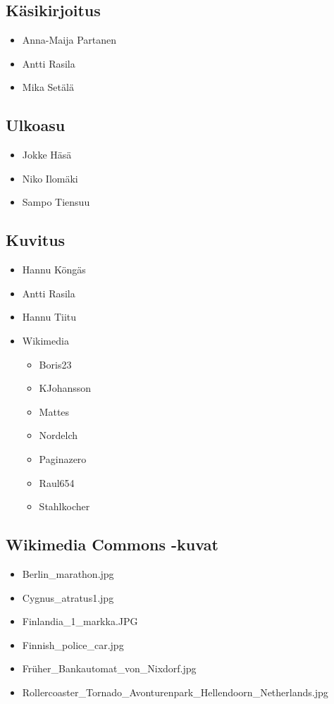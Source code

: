 \subsection*{Käsikirjoitus}
\begin{itemize}
\item Anna-Maija Partanen
\item Antti Rasila
\item Mika Setälä
\end{itemize}

\subsection*{Ulkoasu}
\begin{itemize}
\item Jokke Häsä
\item Niko Ilomäki
\item Sampo Tiensuu
\end{itemize}

\subsection*{Kuvitus}
\begin{itemize}
\item Hannu Köngäs
\item Antti Rasila
\item Hannu Tiitu
\item Wikimedia \begin{itemize}
    \item Boris23
    \item KJohansson
    \item Mattes
    \item Nordelch
    \item Paginazero
    \item Raul654
    \item Stahlkocher
    \end{itemize}
\end{itemize}

\subsection*{Wikimedia Commons -kuvat}
\begin{itemize}
    \item {Berlin\_marathon.jpg}
    \item {Cygnus\_atratus1.jpg}
    \item {Finlandia\_1\_markka.JPG}
    \item {Finnish\_police\_car.jpg}
    \item {Früher\_Bankautomat\_von\_Nixdorf.jpg}
    \item {Rollercoaster\_Tornado\_Avonturenpark\_Hellendoorn\_Netherlands.jpg}
\end{itemize}
